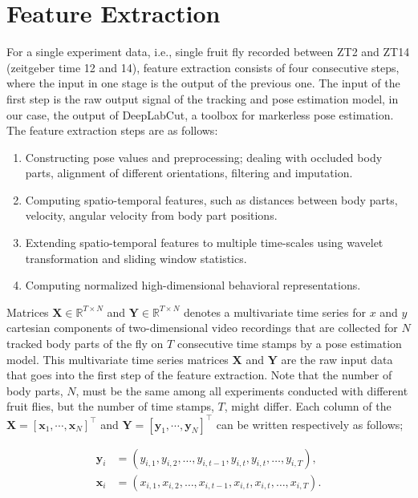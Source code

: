 \chapter{Feature Extraction}
For a single experiment data, i.e., single fruit fly recorded between ZT2 and ZT14 (zeitgeber time 12 and 14), feature extraction consists of four consecutive steps, where the input in one stage is the output of the previous one.
The input of the first step is the raw output signal of the tracking and pose estimation model, in our case, the output of DeepLabCut, a toolbox for markerless pose estimation.
The feature extraction steps are as follows:

\begin{enumerate}
	\item Constructing pose values and preprocessing; dealing with occluded body parts, alignment of different orientations, filtering and imputation.
	\item Computing spatio-temporal features, such as distances between body parts, velocity, angular velocity from body part positions.
	\item Extending spatio-temporal features to multiple time-scales using wavelet transformation and sliding window statistics.
	\item Computing normalized high-dimensional behavioral representations.
\end{enumerate}

Matrices $\mathbf{X} \in \mathbb{R}^{T \times N}$ and $\mathbf{Y} \in \mathbb{R}^{T \times N}$ denotes a multivariate time series for $x$ and $y$ cartesian components of two-dimensional video recordings that are collected for $N$ tracked body parts of the fly on $T$ consecutive time stamps by a pose estimation model. This multivariate time series matrices $\mathbf{X}$ and $\mathbf{Y}$ are the raw input data that goes into the first step of the feature extraction.
Note that the number of body parts, $N$, must be the same among all experiments conducted with different fruit flies, but the number of time stamps, $T$, might differ.
Each column of the $\mathbf{X}=[\mathbf{x}_1, \cdots, \mathbf{x}_N]^\top$ and $\mathbf{Y}=[\mathbf{y}_1, \cdots, \mathbf{y}_N]^\top$ can be written respectively as follows;

\begin{align*}
	\mathbf{y}_i & = (y_{i,1}, y_{i,2}, \dots, y_{i,t-1}, y_{i,t}, y_{i,t}, \dots, y_{i,T}), \\
	\mathbf{x}_i & = (x_{i,1}, x_{i,2}, \dots, x_{i,t-1}, x_{i,t}, x_{i,t}, \dots, x_{i,T}).
\end{align*}


